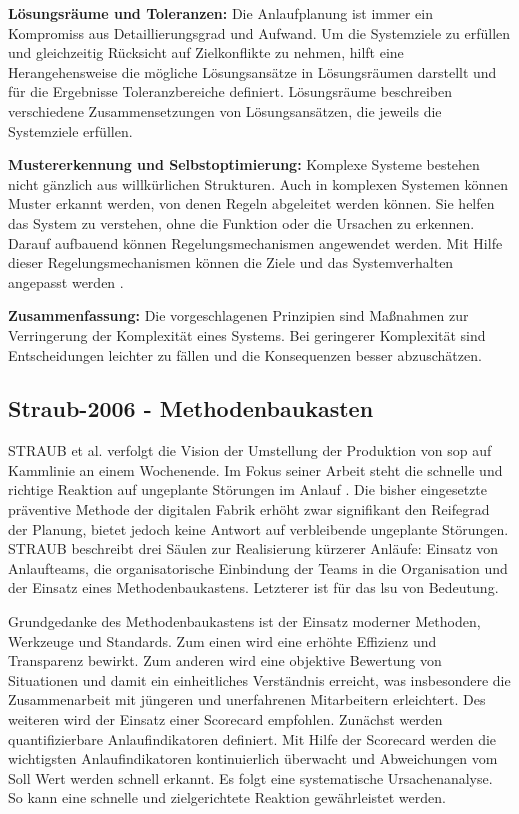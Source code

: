 \textbf{Lösungsräume und Toleranzen:}
Die Anlaufplanung ist immer ein Kompromiss aus Detaillierungsgrad und Aufwand. Um die Systemziele zu erfüllen und gleichzeitig Rücksicht auf Zielkonflikte zu nehmen, hilft eine Herangehensweise die mögliche Lösungsansätze in Lösungsräumen darstellt und für die Ergebnisse Toleranzbereiche definiert. Lösungsräume beschreiben verschiedene Zusammensetzungen von Lösungsansätzen, die jeweils die Systemziele erfüllen. 

\textbf{Mustererkennung und Selbstoptimierung:}
Komplexe Systeme bestehen nicht gänzlich aus willkürlichen Strukturen. Auch in komplexen Systemen können Muster erkannt werden, von denen Regeln abgeleitet werden können. Sie helfen das System zu verstehen, ohne die Funktion oder die Ursachen zu erkennen. Darauf aufbauend können Regelungsmechanismen angewendet werden. Mit Hilfe dieser Regelungsmechanismen können die Ziele und das Systemverhalten angepasst werden \cite{Frank2009}. %

\textbf{Zusammenfassung:}
Die vorgeschlagenen Prinzipien sind Maßnahmen zur Verringerung der Komplexität eines Systems. Bei geringerer Komplexität sind Entscheidungen leichter zu fällen und die Konsequenzen besser abzuschätzen. 

\subsection*{Straub-2006 - Methodenbaukasten}

STRAUB et al. verfolgt die Vision der Umstellung der Produktion von \gls{sop} 
auf Kammlinie an einem Wochenende. Im Fokus seiner Arbeit steht die schnelle und richtige Reaktion auf ungeplante Störungen im Anlauf \cite{Straub2006}. Die bisher eingesetzte präventive Methode der digitalen Fabrik erhöht zwar signifikant den Reifegrad der Planung, bietet jedoch keine Antwort auf verbleibende ungeplante Störungen. STRAUB beschreibt drei Säulen zur Realisierung kürzerer Anläufe: Einsatz von Anlaufteams, die organisatorische Einbindung der Teams in die Organisation und der Einsatz eines Methodenbaukastens. Letzterer ist für das \gls{lsu} von Bedeutung. 

Grundgedanke des Methodenbaukastens ist der Einsatz moderner Methoden, Werkzeuge und Standards.
Zum einen wird eine erhöhte Effizienz und Transparenz bewirkt. Zum anderen wird eine objektive Bewertung von Situationen und damit ein einheitliches Verständnis erreicht, was insbesondere die Zusammenarbeit mit jüngeren und unerfahrenen Mitarbeitern erleichtert. 
Des weiteren wird der Einsatz einer Scorecard empfohlen. %
Zunächst werden quantifizierbare Anlaufindikatoren definiert. Mit Hilfe der Scorecard werden die wichtigsten Anlaufindikatoren kontinuierlich überwacht und Abweichungen vom Soll Wert werden schnell erkannt. Es folgt eine systematische Ursachenanalyse. So kann eine schnelle und zielgerichtete Reaktion gewährleistet werden. 


